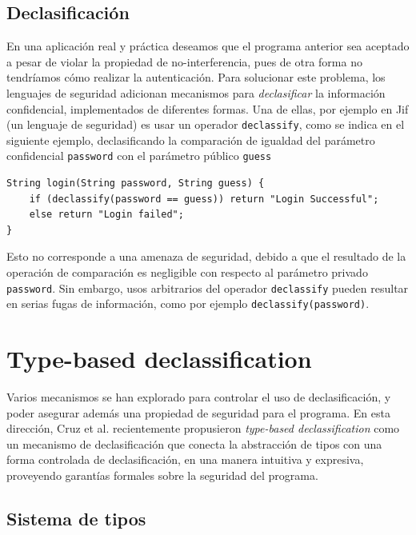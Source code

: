 	\subsection{Declasificación}
	En una aplicación real y práctica deseamos que el programa anterior sea aceptado a pesar de violar la propiedad de no-interferencia, pues de otra forma no tendríamos cómo realizar la autenticación. Para solucionar este problema, los lenguajes de seguridad adicionan mecanismos para \textit{declasificar} la información confidencial, implementados de diferentes formas\cite{sabelfeldSands:JCS09}. Una de ellas, por ejemplo en Jif (un lenguaje de seguridad)\cite{jif} es usar un operador \texttt{declassify}, como se indica en el siguiente ejemplo, declasificando la comparación de igualdad del parámetro confidencial \texttt{password} con el parámetro público \texttt{guess} %

\begin{lstlisting}
String login(String password, String guess) {
	if (declassify(password == guess)) return "Login Successful";
	else return "Login failed";
}
\end{lstlisting}

	Esto no corresponde a una amenaza de seguridad, debido a que el resultado de la operación de comparación es negligible con respecto al parámetro privado \texttt{password}. Sin embargo, usos arbitrarios del operador \texttt{declassify} pueden resultar en serias fugas de información, como por ejemplo \texttt{declassify(password)}.

	\section{Type-based declassification}

	Varios mecanismos se han explorado para controlar el uso de declasificación, y poder asegurar además una propiedad de seguridad para el programa\cite{sabelfeldSands:JCS09}. En esta dirección, Cruz et al.\cite{cruzAl:ecoop2017} recientemente propusieron \textit{type-based declassification} como un mecanismo de declasificación que conecta la abstracción de tipos con una forma controlada de declasificación, en una manera intuitiva y expresiva, proveyendo garantías formales sobre la seguridad del programa. %

	\subsection{Sistema de tipos}

